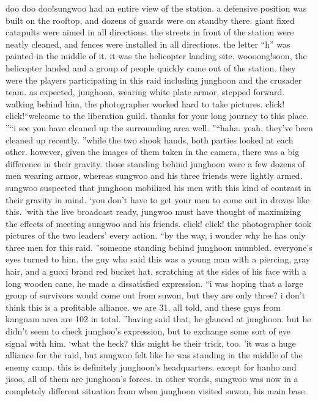 doo doo doo!sungwoo had an entire view of the station.
 a defensive position was built on the rooftop, and dozens of guards were on standby there.
 giant fixed catapults were aimed in all directions.
the streets in front of the station were neatly cleaned, and fences were installed in all directions.
 the letter “h” was painted in the middle of it.
 it was the helicopter landing site.
woooong!soon, the helicopter landed and a group of people quickly came out of the station.
 they were the players participating in this raid including junghoon and the crusader team.
as expected, junghoon, wearing white plate armor, stepped forward.
 walking behind him, the photographer worked hard to take pictures.
click! click!“welcome to the liberation guild.
 thanks for your long journey to this place.
”“i see you have cleaned up the surrounding area well.
”“haha.
 yeah, they’ve been cleaned up recently.
”while the two shook hands, both parties looked at each other.
 however, given the images of them taken in the camera, there was a big difference in their gravity.
those standing behind junghoon were a few dozens of men wearing armor, whereas sungwoo and his three friends were lightly armed.
 sungwoo suspected that junghoon mobilized his men with this kind of contrast in their gravity in mind.
‘you don’t have to get your men to come out in droves like this.
’with the live broadcast ready, jungwoo must have thought of maximizing the effects of meeting sungwoo and his friends.
click! click!
the photographer took pictures of the two leaders’ every action.
“by the way, i wonder why he has only three men for this raid.
”someone standing behind junghoon mumbled.
 everyone’s eyes turned to him.
the guy who said this was a young man with a piercing, gray hair, and a gucci brand red bucket hat.
 scratching at the sides of his face with a long wooden cane, he made a dissatisfied expression.
“i was hoping that a large group of survivors would come out from suwon, but they are only three? i don’t think this is a profitable alliance.
 we are 31, all told, and these guys from kangnam area are 102 in total.
”having said that, he glanced at junghoon.
 but he didn’t seem to check junghoo’s expression, but to exchange some sort of eye signal with him.
‘what the heck? this might be their trick, too.
’it was a huge alliance for the raid, but sungwoo felt like he was standing in the middle of the enemy camp.
this is definitely junghoon’s headquarters.
 except for hanho and jisoo, all of them are junghoon’s forces.
 in other words, sungwoo was now in a completely different situation from when junghoon visited suwon, his main base.
